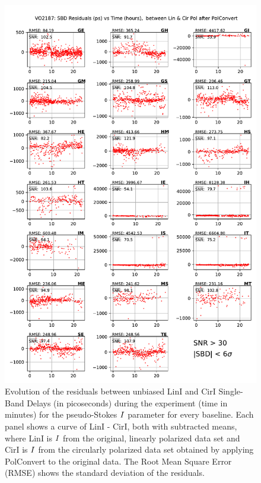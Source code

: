 \documentclass[letterpaper,twoside,12pt]{article}
\begin{document}
\begin{figure}[ht!]
  \begin{center}
  \includegraphics[width=33pc]{VO2187_SBD_Lin_I_minus_Cir_I_SNR_floor_30.pdf}
  \caption{\small Evolution of the residuals between unbiased LinI and CirI Single-Band Delays (in picoseconds) during the experiment (time in minutes) for the pseudo-Stokes $\protect I$ parameter for every baseline. Each panel shows a curve of LinI - CirI, both with subtracted means, where LinI is $\protect I$ from the original, linearly polarized data set and CirI is $\protect I$ from the circularly polarized data set obtained by applying PolConvert to the original data.  The Root Mean Square Error (RMSE) shows the standard deviation of the residuals.}
  \label{sbd_lin_minus_cir}
  \end{center}
\end{figure}
\end{document}

